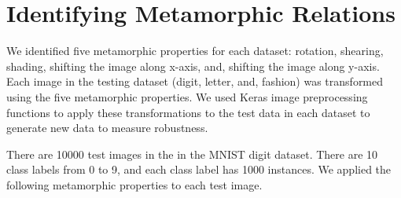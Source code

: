 \section{Identifying Metamorphic Relations} \label{identifyingMR}
We identified five metamorphic properties for each dataset: rotation, shearing, shading, shifting the image along x-axis, and, shifting the image along y-axis. Each image in the testing dataset (digit, letter, and, fashion) was transformed using the five metamorphic properties. We used Keras image preprocessing functions to apply these transformations to the test data in each dataset to generate new data to measure robustness.

There are 10000 test images in the in the MNIST digit dataset. There are 10 class labels from 0 to 9, and each class label has 1000 instances. We applied the following metamorphic properties to each test image.

